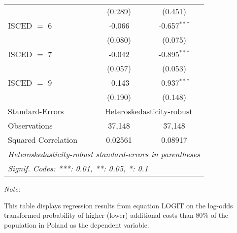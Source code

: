 \begin{table}[htbp!]
\begin{adjustbox}{width = 1\textwidth, max height = 0.95\textheight, center}
\begin{threeparttable}[b]
\begin{tabular}{lcc}
                                 & (0.289)        & (0.451)\\   
            ISCED $=$ 6          & -0.066         & -0.657$^{***}$\\   
                                 & (0.080)        & (0.075)\\   
            ISCED $=$ 7          & -0.042         & -0.895$^{***}$\\   
                                 & (0.057)        & (0.053)\\   
            ISCED $=$ 9          & -0.143         & -0.937$^{***}$\\   
                                 & (0.190)        & (0.148)\\   
            \midrule 
            Standard-Errors & \multicolumn{2}{c}{Heteroskedasticity-robust} \\ 
            Observations         & 37,148         & 37,148\\  
            Squared Correlation  & 0.02561        & 0.08917\\  
            \midrule \midrule
            \multicolumn{3}{l}{\emph{Heteroskedasticity-robust standard-errors in parentheses}}\\
            \multicolumn{3}{l}{\emph{Signif. Codes: ***: 0.01, **: 0.05, *: 0.1}}\\
         \end{tabular}
         
         \begin{tablenotes}\item \medskip \textit{Note:}
            \item This table displays regression results from equation LOGIT on the log-odds transformed probability of higher (lower) additional costs than 80\% of the population in Poland as the dependent variable. 
         \end{tablenotes}
      \end{threeparttable}
   \end{adjustbox}
\end{table}


